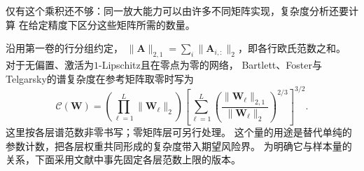 仅有这个乘积还不够：同一放大能力可以由许多不同矩阵实现，复杂度分析还要计算
在给定精度下区分这些矩阵所需的数量。

沿用第一卷的行分组约定，
$\|\bm A\|_{2,1}=\sum_i\|\bm A_{i,:}\|_2$，即各行欧氏范数之和。
对于无偏置、激活为$1$-Lipschitz且在零点为零的网络，
Bartlett、Foster与Telgarsky的谱复杂度在参考矩阵取零时写为
\begin{equation}
 \mathcal C(\bm W)=
 \left(\prod_{\ell=1}^L\|\bm W_\ell\|_2\right)
 \left[\sum_{\ell=1}^L
 \left(\frac{\|\bm W_\ell\|_{2,1}}{\|\bm W_\ell\|_2}\right)^{2/3}
 \right]^{3/2}.
 \label{eq:spectral-margin-bound}
\end{equation}
这里按各层谱范数非零书写；零矩阵层可另行处理。
这个量的用途是替代单纯的参数计数，把各层权重共同形成的复杂度带入期望风险界。
为明确它与样本量的关系，下面采用文献中事先固定各层范数上限的版本。

